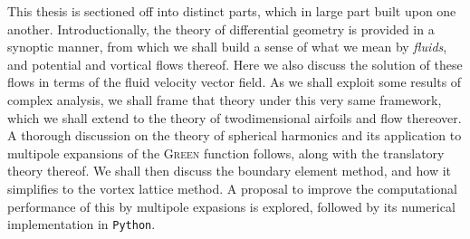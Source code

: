 This thesis is sectioned off into distinct parts, which in large part built upon one another.
Introductionally, the theory of differential geometry is provided in a synoptic manner, from which we shall build a sense of what we mean by \emph{fluids}, and potential and vortical flows thereof.
Here we also discuss the solution of these flows in terms of the fluid velocity vector field.
As we shall exploit some results of complex analysis, we shall frame that theory under this very same framework, which we shall extend to the theory of twodimensional airfoils and flow thereover.
A thorough discussion on the theory of spherical harmonics and its application to multipole expansions of the \textsc{Green} function follows, along with the translatory theory thereof.
We shall then discuss the boundary element method, and how it simplifies to the vortex lattice method.
A proposal to improve the computational performance of this by multipole expasions is explored, followed by its numerical implementation in \texttt{Python}.
